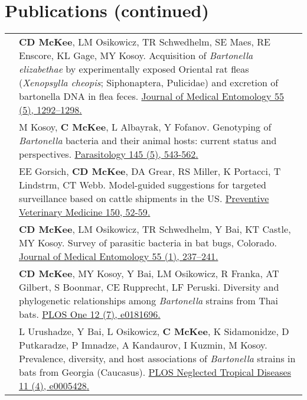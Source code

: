 \documentclass[letterpaper]{deedy-resume} %
\begin{document}
\section{Publications (continued)}
\begin{tabular}{>{\raggedright\arraybackslash}p{2cm}p{16cm}}

2018 & \textbf{CD McKee}, LM Osikowicz, TR Schwedhelm, SE Maes, RE Enscore, KL Gage, MY Kosoy. Acquisition of \textit{Bartonella elizabethae} by experimentally exposed Oriental rat fleas (\textit{Xenopsylla cheopis}; Siphonaptera, Pulicidae) and excretion of bartonella DNA in flea feces. \href{https://doi.org/10.1093/jme/tjy085}{\textcolor{special}{Journal of Medical Entomology 55 (5), 1292–1298}.}\\

2018 & M Kosoy, \textbf{C McKee}, L Albayrak, Y Fofanov. Genotyping of \textit{Bartonella} bacteria and their animal hosts: current status and perspectives. \href{https://doi.org/10.1017/S0031182017001263}{\textcolor{special}{Parasitology 145 (5), 543-562}.}\\

2018 & EE Gorsich, \textbf{CD McKee}, DA Grear, RS Miller, K Portacci, T Lindstrm, CT Webb. Model-guided suggestions for targeted surveillance based on cattle shipments in the US. \href{https://doi.org/10.1016/j.prevetmed.2017.12.004}{\textcolor{special}{Preventive Veterinary Medicine 150, 52-59}.}\\

2018 & \textbf{CD McKee}, LM Osikowicz, TR Schwedhelm, Y Bai, KT Castle, MY Kosoy. Survey of parasitic bacteria in bat bugs, Colorado. \href{https://doi.org/10.1093/jme/tjx155}{\textcolor{special}{Journal of Medical Entomology 55 (1), 237–241}.}\\

2017 & \textbf{CD McKee}, MY Kosoy, Y Bai, LM Osikowicz, R Franka, AT Gilbert, S Boonmar, CE Rupprecht, LF Peruski. Diversity and phylogenetic relationships among \textit{Bartonella} strains from Thai bats. \href{https://doi.org/10.1371/journal.pone.0181696}{\textcolor{special}{PLOS One 12 (7), e0181696}.}\\

2017 & L Urushadze, Y Bai, L Osikowicz, \textbf{C McKee}, K Sidamonidze, D Putkaradze, P Imnadze, A Kandaurov, I Kuzmin, M Kosoy. Prevalence, diversity, and host associations of \textit{Bartonella} strains in bats from Georgia (Caucasus). \href{https://doi.org/10.1371/journal.pntd.0005428}{\textcolor{special}{PLOS Neglected Tropical Diseases 11 (4), e0005428}.}\\


\end{tabular}
\end{document}
